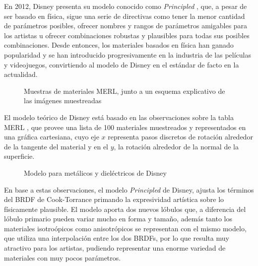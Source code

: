     En 2012, Disney presenta su modelo conocido como \textit{Principled} \autocite{disney12}, que, a pesar de ser basado en f\'isica, sigue una serie de directivas
    como tener la menor cantidad de par\'ametros posibles, ofrecer nombres y rangos de par\'ametros amigables para los artistas u ofrecer
    combinaciones robustas y plausibles para todas sus posibles combinaciones. Desde entonces, los materiales basados en f\'isica
    han ganado popularidad y se han introducido progresivamente en la industria de las pel\'iculas y videojuegos, convirtiendo
    al modelo de Disney en el est\'andar de facto en la actualidad.\\

    \begin{figure}[H]
        \vspace{0.5cm}
        \centering
        \caption{Muestras de materiales MERL, junto a un esquema explicativo de las im\'agenes muestreadas}
        \vspace{0.5cm}
    \end{figure}

    El modelo te\'orico de Disney est\'a basado en las observaciones sobre la tabla MERL \autocite{merl}, que provee una lista
    de 100 materiales muestreados y representados en una gr\'afica cartesiana, cuyo eje $x$ representa pasos discretos de rotaci\'on
    alrededor de la tangente del material y en el $y$, la rotaci\'on alrededor de la normal de la superficie. 

    \begin{figure}[H]
        \vspace{0.5cm}
        \centering
        \caption{Modelo para met\'alicos y diel\'ectricos de Disney}
        \vspace{0.5cm}
    \end{figure}

    En base a estas observaciones, el modelo \textit{Principled} de Disney, ajusta los t\'erminos del BRDF de Cook-Torrance \autocite{cooktorrance}
    primando la expresividad art\'istica sobre lo f\'isicamente plausible. El modelo aporta dos nuevos l\'obulos que, a diferencia del l\'obulo
    primario pueden variar mucho en forma y tama\~no, adem\'as tanto los materiales isotro\'opicos como anisotr\'opicos
    se representan con el mismo modelo, que utiliza una interpolaci\'on entre los dos BRDFs, por lo que resulta muy atractivo para los artistas,
    pudiendo representar una enorme variedad de materiales con muy pocos par\'ametros.\\

